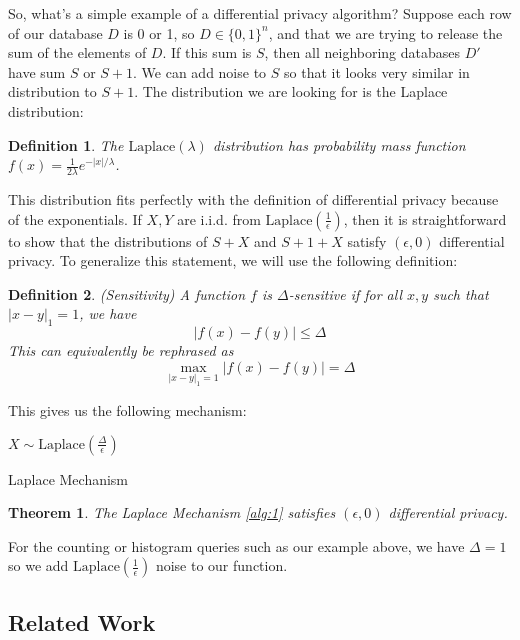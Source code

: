 \documentclass[11pt]{article}
\newtheorem{theorem}{Theorem}
\newtheorem{defn}{Definition}
\begin{document}
So, what's a simple example of a differential privacy algorithm? Suppose each row of our database $D$ is 0 or 1, so $D \in \{0, 1\}^n$, and that we are trying to release the sum of the elements of $D$. If this sum is $S$, then all neighboring databases $D'$ have sum $S$ or $S+1$. We can add noise to $S$ so that it looks very similar in distribution to $S+1$. The distribution we are looking for is the Laplace distribution:
\begin{defn}
The $\text{Laplace}(\lambda)$ distribution has probability mass function $f(x) = \frac{1}{2\lambda}e^{-|x|/\lambda}$.
\end{defn}
This distribution fits perfectly with the definition of differential privacy because of the exponentials. If $X,Y$ are i.i.d. from $\text{Laplace}\left(\frac{1}{\epsilon}\right)$, then it is straightforward to show that the distributions of $S+X$ and $S+1+X$ satisfy $(\epsilon, 0)$ differential privacy. To generalize this statement, we will use the following definition:
\begin{defn}
(Sensitivity) A function $f$ is $\Delta$-sensitive if for all $x,y$ such that $|x-y|_1 = 1$, we have 
\[
|f(x) - f(y)| \leq \Delta
\]
This can equivalently be rephrased as 
\[
\max_{|x-y|_1=1}|f(x) - f(y)| = \Delta
\]
\end{defn}
This gives us the following mechanism:

\begin{algorithm}\label{alg:1}
\SetAlgoLined
{}
$X \sim \text{Laplace}\left(\frac{\Delta}{\epsilon}\right)$\;
\caption{Laplace Mechanism}
\end{algorithm}

\begin{theorem}
The Laplace Mechanism \ref{alg:1} satisfies $(\epsilon, 0)$ differential privacy.
\end{theorem}
For the counting or histogram queries such as our example above, we have $\Delta = 1$ so we add $\text{Laplace}\left(\frac{1}{\epsilon}\right)$ noise to our function.

\subsection{Related Work}
\end{document}
